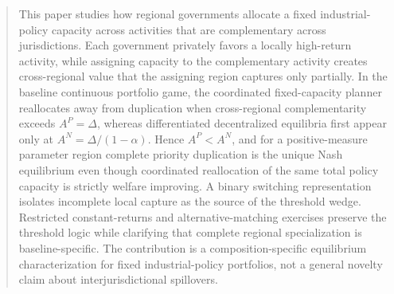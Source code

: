 \begin{abstract}
This paper studies how regional governments allocate a fixed industrial-policy capacity across activities that are complementary across jurisdictions. Each government privately favors a locally high-return activity, while assigning capacity to the complementary activity creates cross-regional value that the assigning region captures only partially. In the baseline continuous portfolio game, the coordinated fixed-capacity planner reallocates away from duplication when cross-regional complementarity exceeds $A^P=\Delta$, whereas differentiated decentralized equilibria first appear only at $A^N=\Delta/(1-\alpha)$. Hence $A^P<A^N$, and for a positive-measure parameter region complete priority duplication is the unique Nash equilibrium even though coordinated reallocation of the same total policy capacity is strictly welfare improving. A binary switching representation isolates incomplete local capture as the source of the threshold wedge. Restricted constant-returns and alternative-matching exercises preserve the threshold logic while clarifying that complete regional specialization is baseline-specific. The contribution is a composition-specific equilibrium characterization for fixed industrial-policy portfolios, not a general novelty claim about interjurisdictional spillovers.
\end{abstract}
